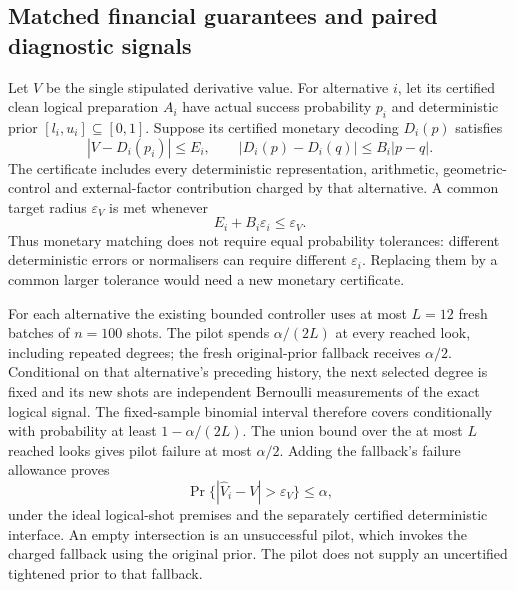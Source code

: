 \subsection{Matched financial guarantees and paired diagnostic signals}
\label{supp:matched-estimator-transfer}

Let $V$ be the single stipulated derivative value. For alternative
$i$, let its certified clean logical preparation $A_i$ have actual
success probability $p_i$ and deterministic prior
$[l_i,u_i]\subseteq[0,1]$. Suppose its certified monetary decoding
$D_i(p)$ satisfies
\begin{equation}
 |V-D_i(p_i)|\leq E_i,
 \qquad |D_i(p)-D_i(q)|\leq B_i|p-q|.
 \label{eq:matched-financial-interface}
\end{equation}
The certificate includes every deterministic representation, arithmetic,
geometric-control and external-factor contribution charged by that
alternative. A common target radius $\varepsilon_V$ is met whenever
\begin{equation}
 E_i+B_i\varepsilon_i\leq\varepsilon_V.
 \label{eq:matched-monetary-budget}
\end{equation}
Thus monetary matching does not require equal probability tolerances:
different deterministic errors or normalisers can require different
$\varepsilon_i$. Replacing them by a common larger tolerance would need
a new monetary certificate.

For each alternative the existing bounded controller uses at most
$L=12$ fresh batches of $n=100$ shots. The pilot spends
$\alpha/(2L)$ at every reached look, including repeated degrees; the
fresh original-prior fallback receives $\alpha/2$. Conditional on that
alternative's preceding history, the next selected degree is fixed and
its new shots are independent Bernoulli measurements of the exact
logical signal. The fixed-sample binomial interval therefore covers
conditionally with probability at least $1-\alpha/(2L)$.
The union bound over the at most $L$ reached looks gives pilot failure
at most $\alpha/2$. Adding the fallback's failure allowance proves
\begin{equation}
 \Pr\{|\widehat V_i-V|>\varepsilon_V\}\leq\alpha,
 \label{eq:matched-alternative-coverage}
\end{equation}
under the ideal logical-shot premises and the separately certified
deterministic interface. An empty intersection is an unsuccessful pilot,
which invokes the charged fallback using the original prior. The pilot
does not supply an uncertified tightened prior to that fallback.

